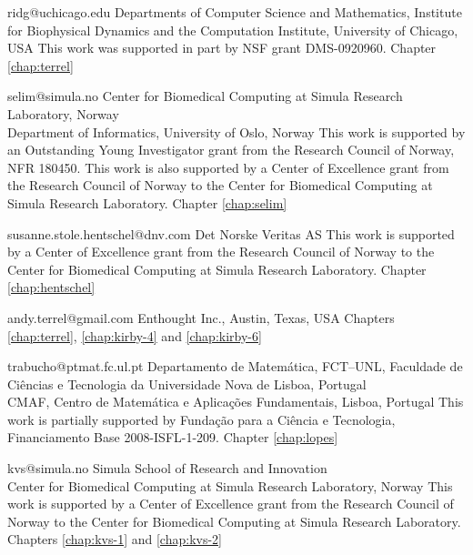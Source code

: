              {ridg@uchicago.edu}
             {Departments of Computer Science and Mathematics,
              Institute for Biophysical Dynamics and the Computation Institute,
              University of Chicago, USA}
             {This work was supported in part by NSF grant DMS-0920960.}
             {Chapter \ref{chap:terrel}}

             {selim@simula.no}
             {Center for Biomedical Computing at Simula Research Laboratory, Norway \\
              Department of Informatics, University of Oslo, Norway}
             {This work is supported by an Outstanding Young
              Investigator grant from the Research Council of Norway,
              NFR 180450. This work is also supported by a Center of
              Excellence grant from the Research Council of Norway to
              the Center for Biomedical Computing at Simula Research
              Laboratory.}
             {Chapter \ref{chap:selim}}

             {susanne.stole.hentschel@dnv.com}
             {Det Norske Veritas AS}
             {This work is supported by a Center of Excellence
              grant from the Research Council of Norway to the Center
              for Biomedical Computing at Simula Research
              Laboratory.}
             {Chapter \ref{chap:hentschel}}

             {andy.terrel@gmail.com}
             {Enthought Inc., Austin, Texas, USA}
             {}
             {Chapters \ref{chap:terrel}, \ref{chap:kirby-4} and \ref{chap:kirby-6}}

             {trabucho@ptmat.fc.ul.pt}
             {Departamento de Matem\'{a}tica, FCT--UNL,
              Faculdade de Ci\^{e}ncias e Tecnologia da Universidade Nova de Lisboa, Portugal \\
              CMAF, Centro de Matem\'{a}tica e Aplica\c{c}\~{o}es Fundamentais, Lisboa, Portugal}
             {This work is partially supported by Funda\c{c}\~{a}o para a Ci\^{e}ncia e Tecnologia, Financiamento Base 2008-ISFL-1-209.}
             {Chapter \ref{chap:lopes}}

             {kvs@simula.no}
             {Simula School of Research and Innovation \\
              Center for Biomedical Computing at Simula Research Laboratory, Norway}
             {This work is supported by a Center of Excellence grant
              from the Research Council of Norway to the Center for
              Biomedical Computing at Simula Research Laboratory.}
             {Chapters \ref{chap:kvs-1} and \ref{chap:kvs-2}}

